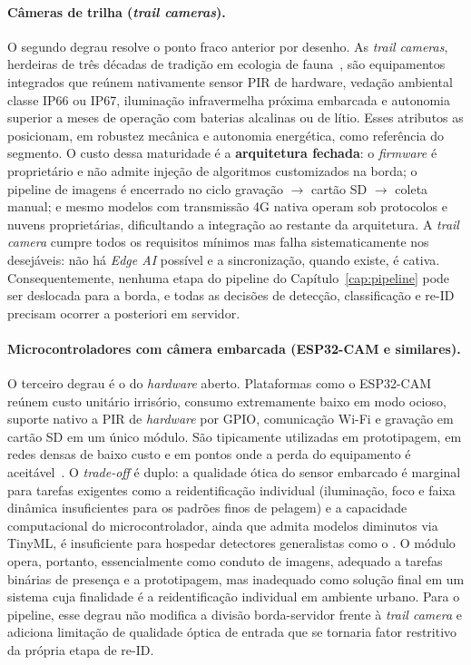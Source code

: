 \paragraph*{Câmeras de trilha (\emph{trail cameras}).} O segundo degrau resolve o ponto fraco anterior por desenho. As \emph{trail cameras}, herdeiras de três décadas de tradição em ecologia de fauna~\cite{bruce2025largescale,cordier2022africa,swanson2015snapshot}, são equipamentos integrados que reúnem nativamente sensor PIR de hardware, vedação ambiental classe IP66 ou IP67, iluminação infravermelha próxima embarcada e autonomia superior a meses de operação com baterias alcalinas ou de lítio. Esses atributos as posicionam, em robustez mecânica e autonomia energética, como referência do segmento. O custo dessa maturidade é a \textbf{arquitetura fechada}: o \emph{firmware} é proprietário e não admite injeção de algoritmos customizados na borda; o pipeline de imagens é encerrado no ciclo gravação $\to$ cartão SD $\to$ coleta manual; e mesmo modelos com transmissão 4G nativa operam sob protocolos e nuvens proprietárias, dificultando a integração ao restante da arquitetura. A \emph{trail camera} cumpre todos os requisitos mínimos mas falha sistematicamente nos desejáveis: não há \emph{Edge AI} possível e a sincronização, quando existe, é cativa. Consequentemente, nenhuma etapa do pipeline do Capítulo~\ref{cap:pipeline} pode ser deslocada para a borda, e todas as decisões de detecção, classificação e re-ID precisam ocorrer a posteriori em servidor.

\paragraph*{Microcontroladores com câmera embarcada (ESP32-CAM e similares).} O terceiro degrau é o do \emph{hardware} aberto. Plataformas como o ESP32-CAM reúnem custo unitário irrisório, consumo extremamente baixo em modo ocioso, suporte nativo a PIR de \emph{hardware} por GPIO, comunicação Wi-Fi e gravação em cartão SD em um único módulo. São tipicamente utilizadas em prototipagem, em redes densas de baixo custo e em pontos onde a perda do equipamento é aceitável~\cite{velasco2024smartcameratraps}. O \emph{trade-off} é duplo: a qualidade ótica do sensor embarcado é marginal para tarefas exigentes como a reidentificação individual (iluminação, foco e faixa dinâmica insuficientes para os padrões finos de pelagem) e a capacidade computacional do microcontrolador, ainda que admita modelos diminutos via TinyML, é insuficiente para hospedar detectores generalistas como o \modeloMD. O módulo opera, portanto, essencialmente como conduto de imagens, adequado a tarefas binárias de presença e a prototipagem, mas inadequado como solução final em um sistema cuja finalidade é a reidentificação individual em ambiente urbano. Para o pipeline, esse degrau não modifica a divisão borda-servidor frente à \emph{trail camera} e adiciona limitação de qualidade óptica de entrada que se tornaria fator restritivo da própria etapa de re-ID.


